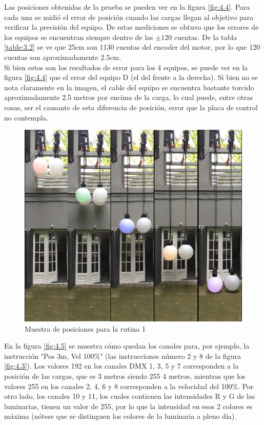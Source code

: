 Las posiciones obtenidas de la prueba se pueden ver en la figura \ref{fig:4.4}. Para cada una se midió el error de posición cuando las cargas llegan al objetivo para verificar la precisión del equipo. De estas mediciones se obtuvo que los errores de los equipos se encuentran siempre dentro de las \( \pm 120 \) cuentas. De la tabla \ref{table:3.2} se ve que 25cm son 1130 cuentas del encoder del motor, por lo que 120 cuentas son aproximadamente 2.5cm.\\
Si bien estos son los resultados de error para los 4 equipos, se puede ver en la figura \ref{fig:4.4} que el error del equipo D (el del frente a la derecha). Si bien no se nota claramente en la imagen, el cable del equipo se encuentra bastante torcido aproximadamente 2.5 metros por encima de la carga, lo cual puede, entre otras cosas, ser el causante de esta diferencia de posición, error que la placa de control no contempla.

\begin{figure}[!ht]
	\centering
	\includegraphics[width=16cm,scale=1]{resources/4_4-cuelist1_resultados.jpg}
	\caption{Muestra de posiciones para la rutina 1}
	\label{fig:\thefigure}
\end{figure}

En la figura \ref{fig:4.5} se muestra cómo quedan los canales para, por ejemplo, la instrucción "Pos 3m, Vel 100\%" (las instrucciones número 2 y 8 de la figura \ref{fig:4.3}). Los valores 192 en los canales DMX 1, 3, 5 y 7 corresponden a la posición de las cargas, que es 3 metros siendo 255 4 metros, mientras que los valores 255 en los canales 2, 4, 6 y 8 corresponden a la velocidad del 100\%. Por otro lado, los canales 10 y 11, los cuales contienen las intensidades R y G de las luminarias, tienen un valor de 255, por lo que la intensidad en esos 2 colores es máxima (nótese que se distinguen los colores de la luminaria a pleno día).

